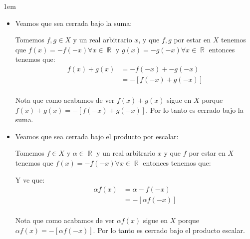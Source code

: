 \documentclass[12pt, fleqn]{report}                             %
\newenvironment{SmallIndentation}[1][0.75em]                    %
        {\begin{adjustwidth}{#1}{}\begin{footnotesize}}             %
        {\end{footnotesize}\end{adjustwidth}}                       %
\theoremstyle{break}                                            %
\DeclareMathOperator \Reals        {\mathbb{R}}                 %
\begin{document}
\begin{itemize}
\begin{SmallIndentation}[1em]
\begin{itemize}
                            \item
                                Veamos que sea cerrada bajo la suma:

                                Tomemos $f, g \in X$ y un real arbitrario $x$, y que $f, g$ por estar en $X$ tenemos que
                                $f(x) = -f(-x) \forall x \in \Reals$ y $g(x) = -g(-x) \forall x \in \Reals$ 
                                entonces tenemos que:
                                \begin{align*}
                                    f(x) + g(x)
                                        &= -f(-x) + -g(-x)                  \\
                                        &= - [f(-x) + g(-x)]                \\
                                \end{align*}

                                Nota que como acabamos de ver $f(x) + g(x)$ sigue en $X$ porque $f(x) + g(x) = - [f(-x) + g(-x)]$.
                                Por lo tanto es cerrado bajo la suma.

                            \item
                                Veamos que sea cerrada bajo el producto por escalar:

                                Tomemos $f \in X$ y $\alpha \in \Reals$ y un real arbitrario $x$ y que $f$ por estar en $X$
                                tenemos que $f(x) = -f(-x) \forall x \in \Reals$ entonces tenemos que:

                                Y ve que:
                                \begin{align*}
                                    \alpha f(x)
                                        &= \alpha -f(-x)                    \\
                                        &= - [\alpha f(-x)]                 \\
                                \end{align*}

                                Nota que como acabamos de ver $\alpha f(x)$ sigue en $X$ porque $\alpha f(x) = - [\alpha f(-x)]$.
                                Por lo tanto es cerrado bajo el producto escalar.

                        \end{itemize}

                    \end{SmallIndentation}


\end{itemize}
\end{document}
